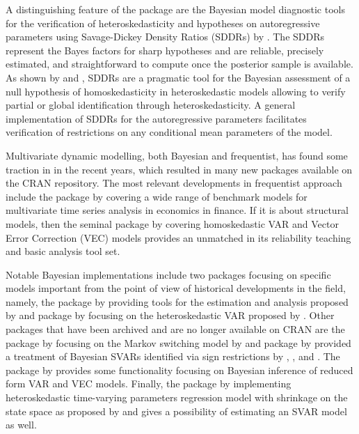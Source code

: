 \documentclass[
  nojss]{jss}
\begin{document}
A distinguishing feature of the package are the Bayesian model
diagnostic tools for the verification of heteroskedasticity and
hypotheses on autoregressive parameters using Savage-Dickey Density
Ratios (SDDRs) by \cite{Verdinelli1995}. The SDDRs represent the Bayes
factors for sharp hypotheses and are reliable, precisely estimated, and
straightforward to compute once the posterior sample is available. As
shown by \cite{LW2017} and \cite{LSUW2024}, SDDRs are a pragmatic tool
for the Bayesian assessment of a null hypothesis of homoskedasticity in
heteroskedastic models allowing to verify partial or global
identification through heteroskedasticity. A general implementation of
SDDRs for the autoregressive parameters facilitates verification of
restrictions on any conditional mean parameters of the model.

Multivariate dynamic modelling, both Bayesian and frequentist, has found
some traction in  in the recent years, which resulted in
many new packages available on the CRAN repository. The most relevant
developments in frequentist approach include the package  by
\cite{MTS} covering a wide range of benchmark models for multivariate
time series analysis in economics in finance. If it is about structural
models, then the seminal package  by \cite{vars} covering
homoskedastic VAR and Vector Error Correction (VEC) models provides an
unmatched in its reliability teaching and basic analysis tool set.

Notable Bayesian implementations include two packages focusing on
specific models important from the point of view of historical
developments in the field, namely, the package  by \cite{BVAR}
providing tools for the estimation and analysis proposed by
\cite{Giannone2015} and package  by \cite{bvarsv} focusing
on the heteroskedastic VAR proposed by \cite{Primiceri2005}. Other
packages that have been archived and are no longer available on CRAN are
the package  by \cite{MSBVAR} focusing on the Markov
switching model by \cite{Sims2006} and package  by
\cite{VARsignR} provided a treatment of Bayesian SVARs identified via
sign restrictions by \cite{uhlig2005effects},
\cite{rubio2010structural}, and \cite{fry2011sign}. The package
 by \cite{bvartools} provides some functionality focusing
on Bayesian inference of reduced form VAR and VEC models. Finally, the
package  by \cite{shrinkTVP} implementing heteroskedastic
time-varying parameters regression model with shrinkage on the state
space as proposed by \cite{Bitto2019} and \cite{Cadonna2020} gives a
possibility of estimating an SVAR model as well.
\end{document}
